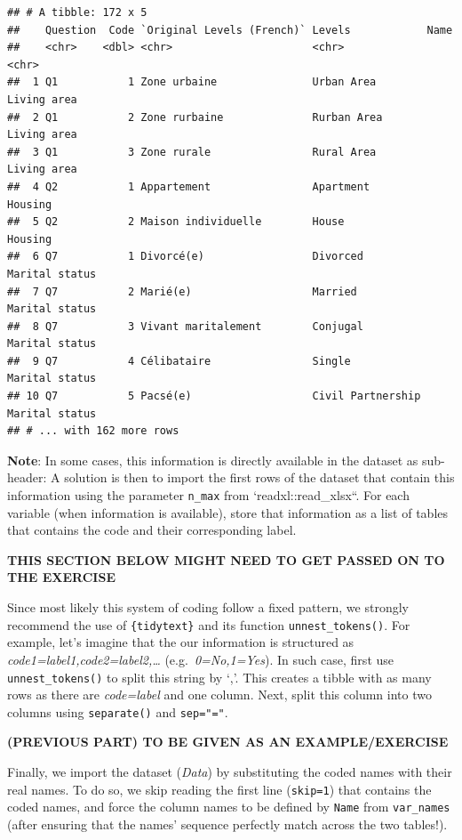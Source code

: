 \documentclass[
]{book}
\begin{document}
\begin{verbatim}
## # A tibble: 172 x 5
##    Question  Code `Original Levels (French)` Levels            Name          
##    <chr>    <dbl> <chr>                      <chr>             <chr>         
##  1 Q1           1 Zone urbaine               Urban Area        Living area   
##  2 Q1           2 Zone rurbaine              Rurban Area       Living area   
##  3 Q1           3 Zone rurale                Rural Area        Living area   
##  4 Q2           1 Appartement                Apartment         Housing       
##  5 Q2           2 Maison individuelle        House             Housing       
##  6 Q7           1 Divorcé(e)                 Divorced          Marital status
##  7 Q7           2 Marié(e)                   Married           Marital status
##  8 Q7           3 Vivant maritalement        Conjugal          Marital status
##  9 Q7           4 Célibataire                Single            Marital status
## 10 Q7           5 Pacsé(e)                   Civil Partnership Marital status
## # ... with 162 more rows
\end{verbatim}

\textbf{Note}: In some cases, this information is directly available in the dataset as sub-header: A solution is then to import the first rows of the dataset that contain this information using the parameter \texttt{n\_max} from `readxl::read\_xlsx``. For each variable (when information is available), store that information as a list of tables that contains the code and their corresponding label.

\textbf{THIS SECTION BELOW MIGHT NEED TO GET PASSED ON TO THE EXERCISE}

Since most likely this system of coding follow a fixed pattern, we strongly recommend the use of \texttt{\{tidytext\}} and its function \texttt{unnest\_tokens()}.
For example, let's imagine that the our information is structured as \emph{code1=label1,code2=label2,\ldots{}} (e.g.~\emph{0=No,1=Yes}). In such case, first use \texttt{unnest\_tokens()} to split this string by `,'. This creates a tibble with as many rows as there are \emph{code=label} and one column. Next, split this column into two columns using \texttt{separate()} and \texttt{sep="="}.

\textbf{(PREVIOUS PART) TO BE GIVEN AS AN EXAMPLE/EXERCISE}

Finally, we import the dataset (\emph{Data}) by substituting the coded names with their real names.
To do so, we skip reading the first line (\texttt{skip=1}) that contains the coded names, and force the column names to be defined by \texttt{Name} from \texttt{var\_names} (after ensuring that the names' sequence perfectly match across the two tables!).
\end{document}
